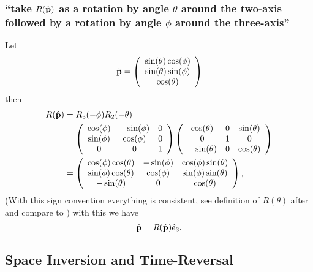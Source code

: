 \subsubsection{\enquote{take $R(\hat{\mathbf{p}})$ as a rotation by angle $\theta$ around the two-axis followed by a rotation by angle $\phi$ around the three-axis} }\label{sususec:2_5_p73_1}
Let \[\hat{\mathbf{p}}=\left(\begin{array}{c}
	\sin(\theta)\cos(\phi)\\
	\sin(\theta)\sin(\phi)\\
	\cos(\theta)
\end{array}\right)\]
then
\begin{align*} 
	R(\hat{\mathbf{p}})&=R_3(-\phi)R_2(-\theta)\\
	&=
	\left(\begin{array}{ccc}
	\cos(\phi)	& -\sin(\phi) & 0 \\
	\sin(\phi)	& \cos(\phi) & 0 \\
	0	& 0 & 1
	\end{array}\right)
	\left(\begin{array}{ccc}
	\cos(\theta) & 0 &  \sin(\theta)\\
	0	& 1 &  0\\
	-\sin(\theta)& 0 & \cos(\theta)
	\end{array}\right)\\
	&=
	\left(\begin{array}{ccc}
		\cos(\phi)\cos(\theta)	& -\sin(\phi) & \cos(\phi)\sin(\theta) \\
		\sin(\phi)\cos(\theta)	& \cos(\phi) & 	\sin(\phi)\sin(\theta) \\
		-\sin(\theta)	& 0 & \cos(\theta)
	\end{array}\right),
\end{align*}
(With this sign convention everything is consistent, see definition of $R(\theta)$ after  and compare  to  \label{sign_convention_of_rotation_matrix})
with this we have \[\hat{\mathbf{p}}=R(\hat{\mathbf{p}}) \hat{e}_3. \]


\subsection{Space Inversion and Time-Reversal}\label{susec:2_6}

